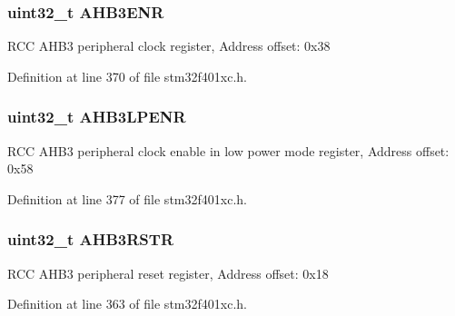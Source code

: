 \subsubsection[{\texorpdfstring{A\+H\+B3\+E\+NR}{AHB3ENR}}]{ uint32\+\_\+t A\+H\+B3\+E\+NR}\hypertarget{struct_r_c_c___type_def_acdaa650fcd63730825479f6e8f70d4c0}{}\label{struct_r_c_c___type_def_acdaa650fcd63730825479f6e8f70d4c0}
R\+CC A\+H\+B3 peripheral clock register, Address offset\+: 0x38 

Definition at line 370 of file stm32f401xc.\+h.

\subsubsection[{\texorpdfstring{A\+H\+B3\+L\+P\+E\+NR}{AHB3LPENR}}]{ uint32\+\_\+t A\+H\+B3\+L\+P\+E\+NR}\hypertarget{struct_r_c_c___type_def_a2ff82b9bf0231645108965aa0febd766}{}\label{struct_r_c_c___type_def_a2ff82b9bf0231645108965aa0febd766}
R\+CC A\+H\+B3 peripheral clock enable in low power mode register, Address offset\+: 0x58 

Definition at line 377 of file stm32f401xc.\+h.

\subsubsection[{\texorpdfstring{A\+H\+B3\+R\+S\+TR}{AHB3RSTR}}]{ uint32\+\_\+t A\+H\+B3\+R\+S\+TR}\hypertarget{struct_r_c_c___type_def_a28560c5bfeb45326ea7f2019dba57bea}{}\label{struct_r_c_c___type_def_a28560c5bfeb45326ea7f2019dba57bea}
R\+CC A\+H\+B3 peripheral reset register, Address offset\+: 0x18 

Definition at line 363 of file stm32f401xc.\+h.

